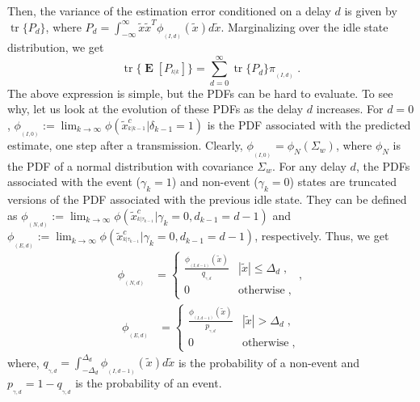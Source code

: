 \documentclass[twocolumn]{autart}
\DeclareMathOperator*{\E}{{\mathbf E}}        \let\Pr\undefined \DeclareMathOperator{\Pr}{{\mathbf P}}        \DeclareMathOperator*{\argmax}{arg\,max}
\DeclareMathOperator{\tr}{tr}
\begin{document}
Then, the variance of the estimation error conditioned on a delay $d$ is given by $\tr\{P_d\}$, where $P_d = \int_{-\infty}^{\infty} \tilde{x} \tilde{x}^T \phi_{_{(I,d)}}(\tilde{x}) d \tilde{x}$. Marginalizing over the idle state distribution, we get
\begin{equation} \label{Eq:EstErrCov}
\tr\{\E[P_{^{k|k}}]\} = \sum_{d=0}^{\infty} \tr\{P_d\} \pi_{_{(I,d)}} \; .
\end{equation}
The above expression is simple, but the PDFs can be hard to evaluate. To see why, let us look at the evolution of these PDFs as the delay $d$ increases. For $d=0$, $\phi_{_{(I,0)}} := \lim_{k \to \infty} \phi(\tilde{x}^c_{^{k|k-1}} | \delta_{k-1} = 1)$ is the PDF associated with the predicted estimate, one step after a transmission. Clearly, $\phi_{_{(I,0)}} = \phi_N(\Sigma_w)$, where $\phi_N$ is the PDF of a normal distribution with covariance $\Sigma_w$. For any delay $d$, the PDFs associated with the event ($\gamma_k = 1$) and non-event ($\gamma_k = 0$) states are truncated versions of the PDF associated with the previous idle state. They can be defined as $\phi_{_{(N,d)}} := \lim_{k \to \infty} \phi(\tilde{x}^c_{^{k|\tau_{k-1}}} | \gamma_k = 0, d_{k-1} = d-1)$ and $\phi_{_{(E,d)}} := \lim_{k \to \infty} \phi(\tilde{x}^c_{^{k|\tau_{k-1}}} | \gamma_k = 0, d_{k-1} = d-1)$, respectively. Thus, we get
\begin{align}
\phi_{_{(N,d)}} &= \begin{cases}
\frac{\phi_{_{(I,d-1)}}(\tilde{x})}{q_{_{\gamma,d}}} & |\tilde{x}| \le \Delta_d \; ,\\
0 & \textrm{otherwise} \; ,
\end{cases} \; , \label{Eq:pdfNd}
\end{align}
\begin{align}
\phi_{_{(E,d)}} &= \begin{cases}
\frac{\phi_{_{(I,d-1)}}(\tilde{x})}{p_{_{\gamma,d}}} & |\tilde{x}| > \Delta_d \; , \\
0 & \textrm{otherwise} \; ,
\end{cases} \label{Eq:pdfEd}
\end{align}
where, $q_{_{\gamma,d}} = \int_{-\Delta_d}^{\Delta_d} \phi_{_{(I,d-1)}}(\tilde{x}) d \tilde{x}$ is the probability of a non-event and $p_{_{\gamma,d}} = 1-q_{_{\gamma,d}}$ is the probability of an event.
\end{document}
